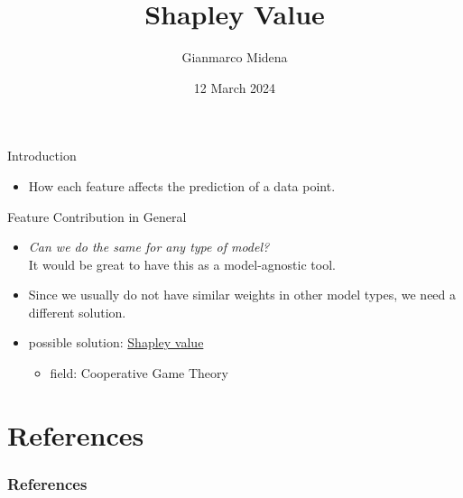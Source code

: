 \documentclass[dvipsnames]{beamer}
\title%
{Shapley Value}
\author{Gianmarco Midena}
\institute{Aalto University}
\date{12 March 2024}
\newcommand{\red}[1]{{\color{red} #1}}
\begin{document}
\begin{frame}
\titlepage
\end{frame}


\begin{frame}{Introduction}
	\begin{itemize}
		\item How each feature affects the prediction of a data point.
	\end{itemize}
\end{frame}



\begin{frame}{Feature Contribution in General}
	\begin{itemize}
		\item \emph{Can we do the same for any type of model?}
		\\It would be great to have this as a model-agnostic tool.
		\item \red{Since we usually do not have similar weights in other model types, we need a different solution.}
		\item possible solution: \underline{Shapley value}
		\begin{itemize}
			\item field: Cooperative Game Theory
		\end{itemize}
	\end{itemize}
\end{frame}



\section{References}
\begin{frame}[allowframebreaks]
\frametitle{References}
\printbibliography
\end{frame}
\end{document}
